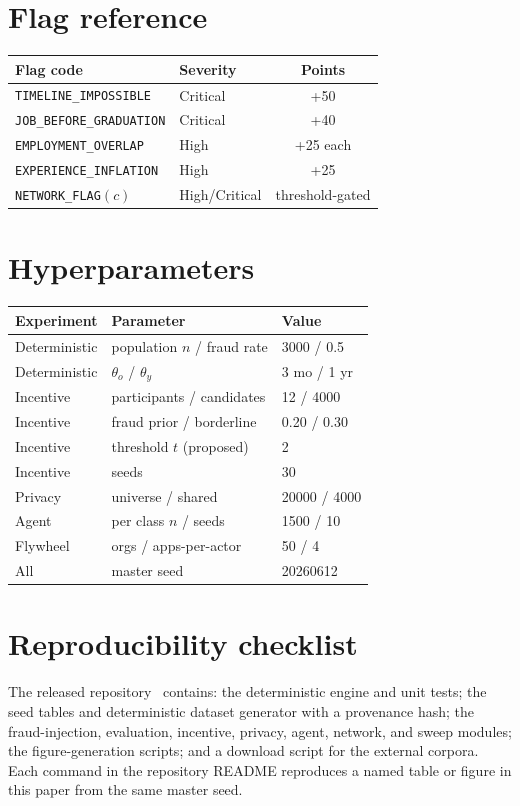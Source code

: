 \documentclass[11pt]{article}
\newcommand{\code}[1]{\texttt{\small #1}}
\begin{document}
\section{Flag reference}\label{app:flags}
\begin{table}[h]\centering\small
\begin{tabular}{llc}
\toprule
Flag code & Severity & Points \\
\midrule
\code{TIMELINE\_IMPOSSIBLE} & Critical & +50 \\
\code{JOB\_BEFORE\_GRADUATION} & Critical & +40 \\
\code{EMPLOYMENT\_OVERLAP} & High & +25 each \\
\code{EXPERIENCE\_INFLATION} & High & +25 \\
\code{NETWORK\_FLAG}$(c)$ & High/Critical & threshold-gated \\
\bottomrule
\end{tabular}
\end{table}

\section{Hyperparameters}\label{app:hyper}
\begin{table}[h]\centering\small
\begin{tabular}{lll}
\toprule
Experiment & Parameter & Value \\
\midrule
Deterministic & population $n$ / fraud rate & 3000 / 0.5 \\
Deterministic & $\theta_o$ / $\theta_y$ & 3 mo / 1 yr \\
Incentive & participants / candidates & 12 / 4000 \\
Incentive & fraud prior / borderline & 0.20 / 0.30 \\
Incentive & threshold $t$ (proposed) & 2 \\
Incentive & seeds & 30 \\
Privacy & universe / shared & 20000 / 4000 \\
Agent & per class $n$ / seeds & 1500 / 10 \\
Flywheel & orgs / apps-per-actor & 50 / 4 \\
All & master seed & 20260612 \\
\bottomrule
\end{tabular}
\end{table}

\section{Reproducibility checklist}\label{app:repro}
The released repository~\cite{truthhirecode} contains: the deterministic engine
and unit tests; the seed tables and deterministic dataset generator with a
provenance hash; the fraud-injection, evaluation, incentive, privacy, agent,
network, and sweep modules; the figure-generation scripts; and a download script
for the external corpora. Each command in the repository README reproduces a named
table or figure in this paper from the same master seed.
\end{document}
